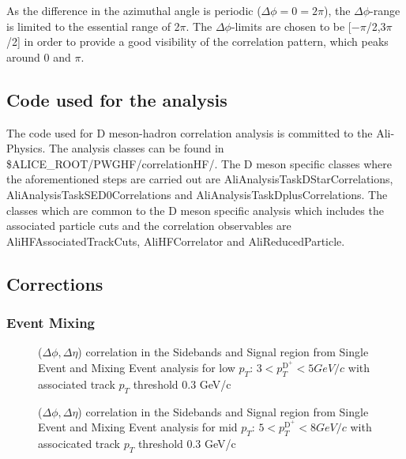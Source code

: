 As the difference in the azimuthal angle is periodic ($\Delta \phi = 0 = 2\pi$),
the $\Delta \phi$-range is limited to the essential range of
2$\pi$. The $\Delta \phi$-limits are chosen to be [$-\pi$/2,3$\pi$/2]
in order to provide a good visibility of the correlation pattern,
which peaks around 0 and $\pi$.

\subsection{Code used for the analysis}
The code used for D meson-hadron correlation analysis is committed
to the Ali-Physics. The analysis classes can be found in
\$ALICE\_ROOT/PWGHF/correlationHF/.  The  D meson specific classes
where the aforementioned steps are carried out are
AliAnalysisTaskDStarCorrelations, AliAnalysisTaskSED0Correlations and
AliAnalysisTaskDplusCorrelations. The classes which are common to the D meson specific analysis
which includes the associated particle cuts and  the correlation
observables are AliHFAssociatedTrackCuts, AliHFCorrelator and AliReducedParticle.


\subsection{Corrections}
\subsubsection{Event Mixing }

\begin{figure}[!ht]
\centering
 \caption{($\Delta \phi , \Delta \eta$) correlation in the Sidebands and Signal region from Single Event and Mixing Event analysis for low $p_{T}$: $3< p_{T}^{\text{D}^+}< 5 GeV/c$ with associated track $p_{T}$ threshold 0.3 GeV/c }
\label{fig:DplusSEbyMEPlots1}
\end{figure}



\begin{figure}[!ht]
\centering
 \caption{($\Delta \phi , \Delta \eta$) correlation in the Sidebands and Signal region from Single Event and Mixing Event analysis for mid $p_{T}$: $5< p_{T}^{\text{D}^+}< 8 GeV/c$ with associcated track $p_{T}$ threshold 0.3 GeV/c }
\label{fig:DplusSEbyMEPlots2}
\end{figure}

